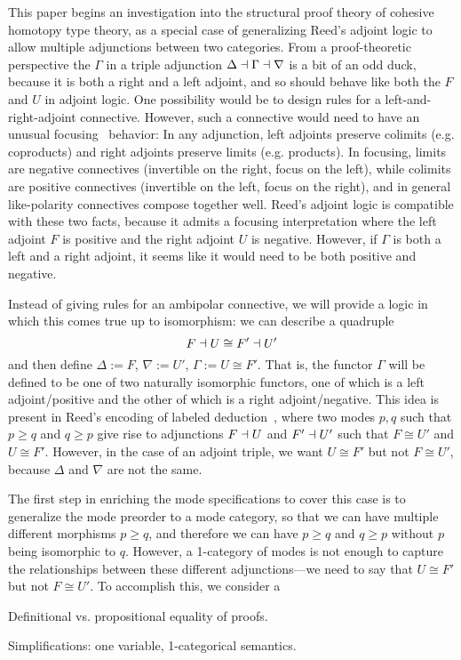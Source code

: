 \documentclass{drl-common/llncs}
\begin{document}
This paper begins an investigation into the structural proof theory of
cohesive homotopy type theory, as a special case of generalizing Reed's
adjoint logic to allow multiple adjunctions between two categories.
From a proof-theoretic perspective the $\Gamma$ in a triple adjunction
$\Delta \dashv \Gamma \dashv \nabla$ is a bit of an odd duck, because it is
both a right and a left adjoint, and so should behave like both the $F$
and $U$ in adjoint logic.  One possibility would be to design rules for
a left-and-right-adjoint connective.  However, such a connective would
need to have an unusual focusing~\citep{andreoli92focus} behavior: In
any adjunction, left adjoints preserve colimits (e.g. coproducts) and
right adjoints preserve limits (e.g. products).  In focusing, limits are
negative connectives (invertible on the right, focus on the left), while
colimits are positive connectives (invertible on the left, focus on the
right), and in general like-polarity connectives compose together well.
Reed's adjoint logic is compatible with these two facts, because it
admits a focusing interpretation where the left adjoint $F$ is positive
and the right adjoint $U$ is negative.  However, if $\Gamma$ is both a
left and a right adjoint, it seems like it would need to be both
positive and negative.  

Instead of giving rules for an ambipolar connective, we will provide a
logic in which this comes true up to isomorphism: we can describe a quadruple
\[
F \dashv U \cong F' \dashv U'
\]
and then define $\Delta := F$, $\nabla := U'$, $\Gamma := U \cong F'$.
That is, the functor $\Gamma$ will be defined to be one of two naturally
isomorphic functors, one of which is a left adjoint/positive and the
other of which is a right adjoint/negative.  This idea is present in
Reed's encoding of labeled deduction~\citep[Section ?]{reed09adjoint},
where two modes $p,q$ such that $p \ge q$ and $q \ge p$ give rise to
adjunctions $F \dashv U$ and $F' \dashv U'$ such that $F \cong U'$ and $U
\cong F'$.  However, in the case of an adjoint triple, we want $U \cong
F'$ but not $F \cong U'$, because $\Delta$ and $\nabla$ are not the
same.  

The first step in enriching the mode specifications to cover this case
is to generalize the mode preorder to a mode category, so that we can
have multiple different morphisms $p \ge q$, and therefore we can have
$p \ge q$ and $q \ge p$ without $p$ being isomorphic to $q$.  However, a
1-category of modes is not enough to capture the relationships between
these different adjunctions---we need to say that $U \cong F'$ but not
$F \cong U'$.  To accomplish this, we consider a 

Definitional vs. propositional equality of proofs.  

Simplifications: one variable, 1-categorical semantics.  








{ %


}
\end{document}
